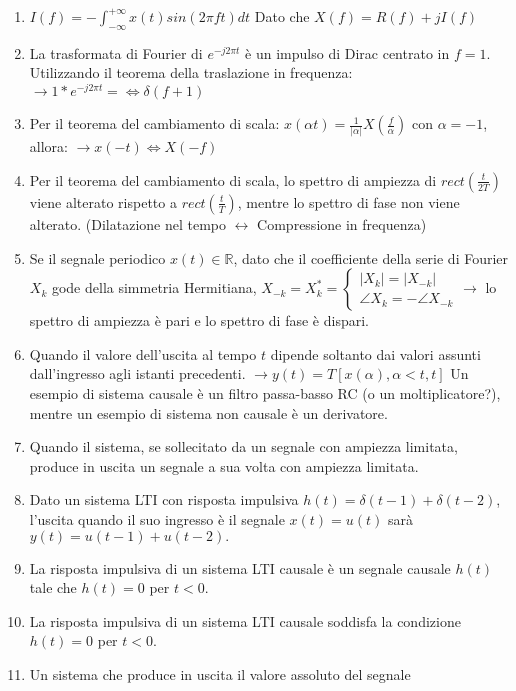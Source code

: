 \documentclass[
]{article}
\begin{document}
\begin{enumerate}
\item
  \(\displaystyle I(f) =- \int_{- \infty}^{+\infty} x(t) sin(2\pi ft)dt\)
  Dato che \(\displaystyle X(f) = R(f)+ jI(f)\)
\item
  La trasformata di Fourier di \(e^{-j2\pi t}\) è un impulso di Dirac
  centrato in \(f = 1\). Utilizzando il teorema della traslazione in
  frequenza: \(\to 1*e^{-j2 \pi t} =\Leftrightarrow \delta (f+1)\)
\item
  Per il teorema del cambiamento di scala:
  \(\displaystyle x(\alpha t) = \frac{1}{|\alpha|} X(\frac{f}{\alpha})\)
  con \(\alpha = -1\), allora: \(\to x(-t) \Leftrightarrow X(-f)\)
\item
  Per il teorema del cambiamento di scala, lo spettro di ampiezza di
  \(rect(\frac{t}{2T})\) viene alterato rispetto a
  \(rect(\frac{t}{T})\), mentre lo spettro di fase non viene alterato.
  (Dilatazione nel tempo \(\leftrightarrow\) Compressione in frequenza)
\item
  Se il segnale periodico \(x(t) \in \mathbb{R}\), dato che il
  coefficiente della serie di Fourier \(X_k\) gode della simmetria
  Hermitiana,
  \(X_{-k} =X_k^* = \begin{cases} |X_k| =|X_{-k}| \\ \angle X_k = - \angle X_{-k} \end{cases} \to\)
  lo spettro di ampiezza è pari e lo spettro di fase è dispari.
\item
  Quando il valore dell'uscita al tempo \(t\) dipende soltanto dai
  valori assunti dall'ingresso agli istanti precedenti.
  \(\to y(t) = T[x(\alpha), \alpha < t, t]\) Un esempio di sistema
  causale è un filtro passa-basso RC (o un moltiplicatore?), mentre un
  esempio di sistema non causale è un derivatore.
\item
  Quando il sistema, se sollecitato da un segnale con ampiezza limitata,
  produce in uscita un segnale a sua volta con ampiezza limitata.
\item
  Dato un sistema LTI con risposta impulsiva
  \(h(t) = \delta(t - 1) + \delta(t - 2)\), l'uscita quando il suo
  ingresso è il segnale \(x(t) = u(t)\) sarà
  \(y(t) = u(t - 1) + u(t - 2).\)
\item
  La risposta impulsiva di un sistema LTI causale è un segnale causale
  \(h(t)\) tale che \(h(t) = 0\) per \(t < 0\).
\item
  La risposta impulsiva di un sistema LTI causale soddisfa la condizione
  \(h(t) = 0\) per \(t < 0\).
\item
  Un sistema che produce in uscita il valore assoluto del segnale

\end{enumerate}
\end{document}
